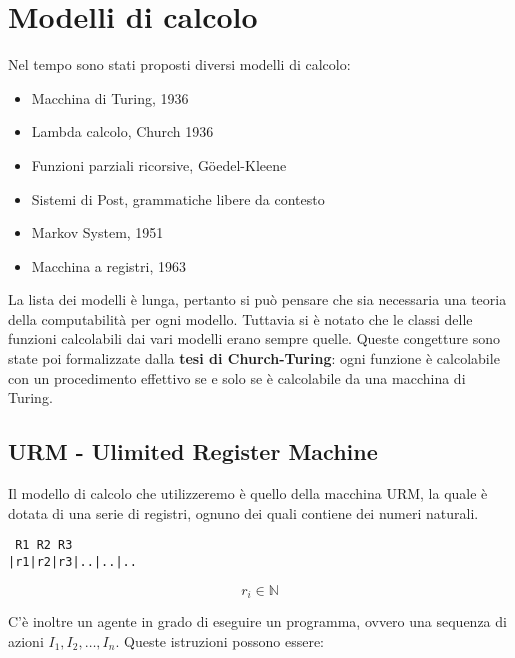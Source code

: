 
\section{Modelli di calcolo}

Nel tempo sono stati proposti diversi modelli di calcolo:

\begin{itemize}
\item
  Macchina di Turing, 1936
\item
  Lambda calcolo, Church 1936
\item
  Funzioni parziali ricorsive, G\"{o}edel-Kleene
\item
  Sistemi di Post, grammatiche libere da contesto
\item
  Markov System, 1951
\item
  Macchina a registri, 1963
\end{itemize}

La lista dei modelli è lunga, pertanto si può pensare che sia necessaria una teoria della computabilità per ogni modello. 
Tuttavia si è notato che le classi delle funzioni calcolabili dai vari modelli erano sempre quelle. 
Queste congetture sono state poi formalizzate dalla \textbf{tesi di Church-Turing}: ogni funzione è calcolabile con un procedimento effettivo se e solo se è calcolabile da una macchina di Turing.

\subsection{URM - Ulimited Register Machine}\label{urm---ulimited-register-machine}

Il modello di calcolo che utilizzeremo è quello della macchina URM, la quale è dotata di una serie di registri, ognuno dei quali contiene dei numeri naturali.

\begin{verbatim}
 R1 R2 R3
|r1|r2|r3|..|..|..
\end{verbatim}

$$r_i \in \mathbb{N}$$

C'è inoltre un agente in grado di eseguire un programma, ovvero una sequenza di azioni $ I_1, I_2, \ldots, I_n$.
Queste istruzioni possono essere:

